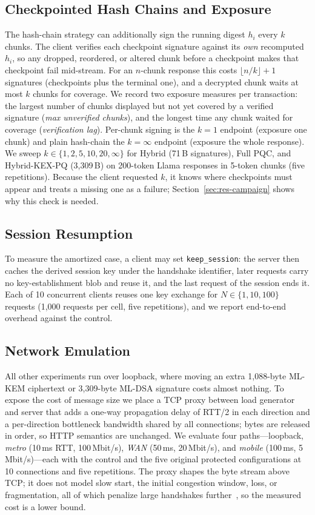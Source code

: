 \documentclass[conference]{IEEEtran}
\begin{document}
\subsection{Checkpointed Hash Chains and Exposure}\label{sec:checkpoint}
The hash-chain strategy can additionally sign the running digest $h_i$ every $k$ chunks. The client
verifies each checkpoint signature against its \emph{own} recomputed $h_i$, so any dropped, reordered,
or altered chunk before a checkpoint makes that checkpoint fail mid-stream. For an $n$-chunk response
this costs $\lfloor n/k\rfloor + 1$ signatures (checkpoints plus the terminal one), and a decrypted
chunk waits at most $k$ chunks for coverage. We record two exposure measures per transaction: the
largest number of chunks displayed but not yet covered by a verified signature (\emph{max unverified
chunks}), and the longest time any chunk waited for coverage (\emph{verification lag}). Per-chunk
signing is the $k{=}1$ endpoint (exposure one chunk) and plain hash-chain the $k{=}\infty$ endpoint
(exposure the whole response). We sweep $k\in\{1,2,5,10,20,\infty\}$ for Hybrid (71\,B signatures), Full
PQC, and Hybrid-KEX-PQ (3,309\,B) on 200-token Llama responses in 5-token chunks (five repetitions).
Because the client requested $k$, it knows where checkpoints must appear and treats a missing one as a
failure; Section~\ref{sec:res-campaign} shows why this check is needed.

\subsection{Session Resumption}\label{sec:sessions}
To measure the amortized case, a client may set \texttt{keep\_session}: the server then caches the
derived session key under the handshake identifier, later requests carry no key-establishment blob
and reuse it, and the last request of the session ends it. Each of 10 concurrent clients reuses one
key exchange for $N\in\{1,10,100\}$ requests (1,000 requests per cell, five repetitions), and we report
end-to-end overhead against the control.

\subsection{Network Emulation}\label{sec:netem}
All other experiments run over loopback, where moving an extra 1,088-byte ML-KEM ciphertext or
3,309-byte ML-DSA signature costs almost nothing. To expose the cost of message size we place a TCP
proxy between load generator and server that adds a one-way propagation delay of RTT/2 in each
direction and a per-direction bottleneck bandwidth shared by all connections; bytes are released in
order, so HTTP semantics are unchanged. We evaluate four paths---loopback, \emph{metro} (10\,ms RTT,
100\,Mbit/s), \emph{WAN} (50\,ms, 20\,Mbit/s), and \emph{mobile} (100\,ms, 5\,Mbit/s)---each with the control
and the five original protected configurations at 10 connections and five repetitions. The proxy shapes the byte stream above TCP; it
does not model slow start, the initial congestion window, loss, or fragmentation, all of which
penalize large handshakes further~\cite{paquin2020benchmarking}, so the measured cost is a lower
bound.
\end{document}
